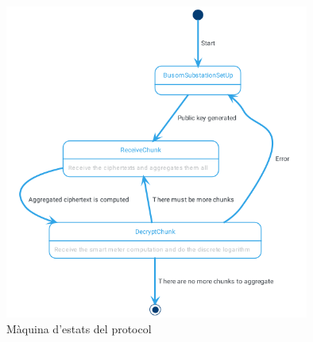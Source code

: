 \begin{figure}[H]
	\centering
	\includegraphics[width=10cm]{classes/busomstatesub.png}
	\caption{Màquina d'estats del protocol \cite{busom}}
	\label{fig:busom-state-sub}
\end{figure}
